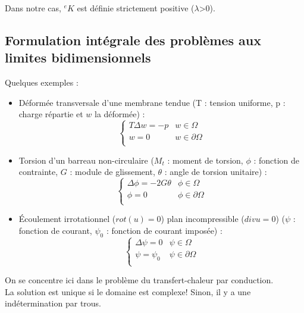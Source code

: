 \documentclass[../main.tex]{subfiles}
\begin{document}
Dans notre cas, ${}^eK$ est définie strictement positive ($\lambda$>0).

\subsection{Formulation intégrale des problèmes aux limites bidimensionnels}

Quelques exemples : \\
\begin{itemize}
    \item Déformée transversale d'une membrane tendue (T : tension uniforme, p : charge répartie et $w$ la déformée) : \begin{equation}
    \begin{cases}
        T\Delta w=-p & w \in \Omega\\
        w=0 & w\in \partial \Omega\\
        \end{cases}
    \end{equation}
    \item Torsion d'un barreau non-circulaire ($M_t$ : moment de torsion, $\phi$ : fonction de contrainte, $G$ : module de glissement, $\theta$ : angle de torsion unitaire) : \begin{equation} \begin{cases}
        \Delta \phi = -2G\theta & \phi \in \Omega\\
        \phi = 0 & \phi \in \partial\Omega\\
    \end{cases}
    \end{equation}
    \item Écoulement irrotationnel ($rot(u)=0$) plan incompressible ($div u=0$) ($\psi$ : fonction de courant, $\psi_0$ : fonction de courant imposée) : \begin{equation}
        \begin{cases}
            \Delta \psi = 0 & \psi \in \Omega\\
            \psi = \psi_0 & \psi \in \partial \Omega\\
        \end{cases}
    \end{equation}
\end{itemize}
On se concentre ici dans le problème du transfert-chaleur par conduction.\\

\warning La solution est unique si le domaine est complexe! Sinon, il y a une indétermination par trous.\\
\end{document}
